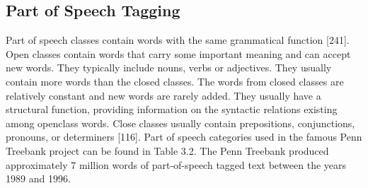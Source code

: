 \documentclass[11pt,openany,executivepaper]{book}
\begin{document}
\subsection{Part of Speech Tagging}
Part of speech classes contain words with the same grammatical function [241]. Open classes contain words that carry some important meaning and can accept new words. They typically include nouns, verbs or adjectives. They usually contain more words than the closed classes. The words from closed classes are relatively constant and new words are rarely added. They usually have a structural function, providing information on the syntactic relations existing among openclass words. Close classes usually contain prepositions, conjunctions, pronouns, or determiners [116]. Part of speech categories used in the famous Penn Treebank project can be found in Table 3.2. The Penn Treebank produced approximately 7 million words of part-of-speech tagged text between the years 1989 and 1996.
\clearpage
\end{document}

